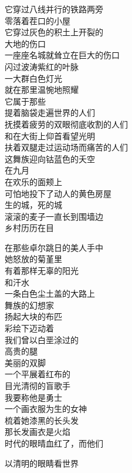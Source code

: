 \documentclass{article}
\begin{document}
它穿过八线并行的铁路两旁\\
零落着茬口的小屋\\
它穿过灰色的积土上开裂的\\
大地的伤口\\
一座座名城就耸立在巨大的伤口\\
闪过波涛紫红的叶脉\\
一大群白色灯光\\
就在那里温惋地照耀\\
它属于那些\\
提着脑袋走遍世界的人们\\
抚摸着疲劳的双眼彻底收割的人们\\
和在大街上仰首看望光明
\\
扶着双腿走过运动场而痛苦的人们 \\ 


这舞族迎向钴蓝色的夭空\\
在九月\\
在欢乐的面颊上\\
可怕地投下了动人的黄色房屋\\
生的城，死的城\\
滚滚的麦子一直长到围墙边\\
乡村历历在目\\
\newpage

在那些卓尔跳日的美人手中\\
她怒放的菊堇里\\
有着那样无辜的阳光
\\
和汗水 \\ 


一条白色尘土盖的大路上\\
舞族的幻想家\\
扬起大块的布匹\\
彩绘下迈动着\\
我们曾以白垩涂过的\\
高贵的腿
\\
美丽的双脚 \\ 


一个平展着红布的\\
目光清彻的盲歌手\\
我要称他是勇士\\
一个画衣服为生的女神\\
梳着她漆黑的长头发\\
那长发画衣是火焰\\
时代的眼晴血红了，而他们
\\
\newpage

以清明的眼睛看世界 \\ 
\end{document}
